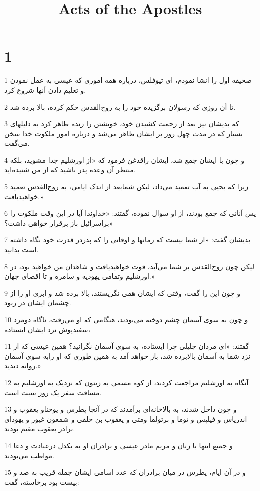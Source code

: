 

\title{Acts of the Apostles}


\chapter{1}

\par 1 صحیفه اول را انشا نمودم، ای تیوفلس، درباره همه اموری که عیسی به عمل نمودن و تعلیم دادن آنها شروع کرد.
\par 2 تا آن روزی که رسولان برگزیده خود را به روح‌القدس حکم کرده، بالا برده شد.
\par 3 که بدیشان نیز بعد از زحمت کشیدن خود، خویشتن را زنده ظاهر کرد به دلیلهای بسیار که در مدت چهل روز بر ایشان ظاهر می‌شد و درباره امور ملکوت خدا سخن می‌گفت.
\par 4 و چون با ایشان جمع شد، ایشان راقدغن فرمود که «از اورشلیم جدا مشوید، بلکه منتظر آن وعده پدر باشید که از من شنیده‌اید.
\par 5 زیرا که یحیی به آب تعمید می‌داد، لیکن شمابعد از اندک ایامی، به روح‌القدس تعمید خواهیدیافت.»
\par 6 پس آنانی که جمع بودند، از او سوال نموده، گفتند: «خداوندا آیا در این وقت ملکوت را براسرائیل باز برقرار خواهی داشت؟»
\par 7 بدیشان گفت: «از شما نیست که زمانها و اوقاتی را که پدردر قدرت خود نگاه داشته است بدانید.
\par 8 لیکن چون روح‌القدس بر شما می‌آید، قوت خواهیدیافت و شاهدان من خواهید بود، در اورشلیم وتمامی یهودیه و سامره و تا اقصای جهان.»
\par 9 و چون این را گفت، وقتی که ایشان همی نگریستند، بالا برده شد و ابری او را از چشمان ایشان در ربود.
\par 10 و چون به سوی آسمان چشم دوخته می‌بودند، هنگامی که او می‌رفت، ناگاه دومرد سفیدپوش نزد ایشان ایستاده،
\par 11 گفتند: «ای مردان جلیلی چرا ایستاده، به سوی آسمان نگرانید؟ همین عیسی که از نزد شما به آسمان بالابرده شد، باز خواهد آمد به همین طوری که او رابه سوی آسمان روانه دیدید.»
\par 12 آنگاه به اورشلیم مراجعت کردند، از کوه مسمی به زیتون که نزدیک به اورشلیم به مسافت سفر یک روز سبت است.
\par 13 و چون داخل شدند، به بالاخانه‌ای برآمدند که در آنجا پطرس و یوحناو یعقوب و اندریاس و فیلپس و توما و برتولما ومتی و یعقوب بن حلفی و شمعون غیور و یهودای برادر بعقوب مقیم بودند.
\par 14 و جمیع اینها با زنان و مریم مادر عیسی و برادران او به یکدل درعبادت و دعا مواظب می‌بودند.
\par 15 و در آن ایام، پطرس در میان برادران که عدد اسامی ایشان جمله قریب به صد و بیست بود برخاسته، گفت:
